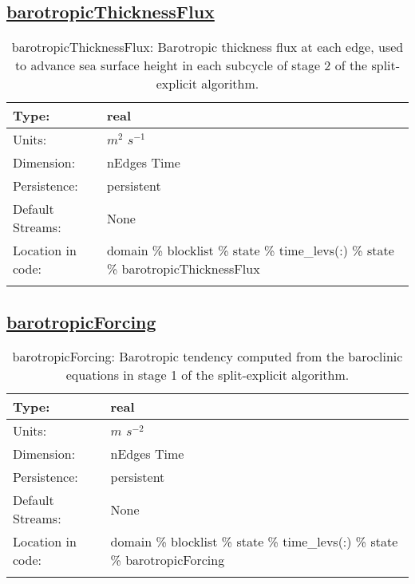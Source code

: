 \subsection[barotropicThicknessFlux]{\hyperref[sec:var_tab_state]{barotropicThicknessFlux}}
\label{subsec:var_sec_state_barotropicThicknessFlux}
\begin{center}
\begin{longtable}{| p{2.0in} | p{4.0in} |}
        \hline 
        Type: & real \\
        \hline 
        Units: & $m^2$ $s^{-1}$ \\
        \hline 
        Dimension: & nEdges Time \\
        \hline 
        Persistence: & persistent \\
        \hline 
		 Default Streams: & None \\
        \hline 
		 Location in code: & domain \% blocklist \% state \% time\_levs(:) \% state \% barotropicThicknessFlux \\
		 \hline 
    \caption{barotropicThicknessFlux: Barotropic thickness flux at each edge, used to advance sea surface height in each subcycle of stage 2 of the split-explicit algorithm.}
\end{longtable}
\end{center}
\subsection[barotropicForcing]{\hyperref[sec:var_tab_state]{barotropicForcing}}
\label{subsec:var_sec_state_barotropicForcing}
\begin{center}
\begin{longtable}{| p{2.0in} | p{4.0in} |}
        \hline 
        Type: & real \\
        \hline 
        Units: & $m$ $s^{-2}$ \\
        \hline 
        Dimension: & nEdges Time \\
        \hline 
        Persistence: & persistent \\
        \hline 
		 Default Streams: & None \\
        \hline 
		 Location in code: & domain \% blocklist \% state \% time\_levs(:) \% state \% barotropicForcing \\
		 \hline 
    \caption{barotropicForcing: Barotropic tendency computed from the baroclinic equations in stage 1 of the split-explicit algorithm.}
\end{longtable}
\end{center}

